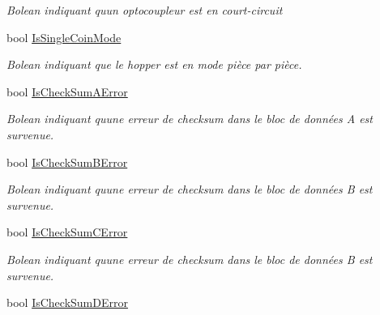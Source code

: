 \begin{DoxyCompactItemize}
\begin{DoxyCompactList}\small\item\em Bolean indiquant qu\textquotesingle{}un optocoupleur est en court-\/circuit \end{DoxyCompactList}\item 
bool \mbox{\hyperlink{class_device_library_1_1_c_hopper_ac8bdea555bab297e4533885935005ad9}{Is\+Single\+Coin\+Mode}}
\begin{DoxyCompactList}\small\item\em Bolean indiquant que le hopper est en mode pièce par pièce. \end{DoxyCompactList}\item 
bool \mbox{\hyperlink{class_device_library_1_1_c_hopper_ab6b53cde806c99f06e7ab4e51044c68c}{Is\+Check\+Sum\+A\+Error}}
\begin{DoxyCompactList}\small\item\em Bolean indiquant qu\textquotesingle{}une erreur de checksum dans le bloc de données A est survenue. \end{DoxyCompactList}\item 
bool \mbox{\hyperlink{class_device_library_1_1_c_hopper_a97fc7f01be900cd25941c1cc0d1ff053}{Is\+Check\+Sum\+B\+Error}}
\begin{DoxyCompactList}\small\item\em Bolean indiquant qu\textquotesingle{}une erreur de checksum dans le bloc de données B est survenue. \end{DoxyCompactList}\item 
bool \mbox{\hyperlink{class_device_library_1_1_c_hopper_abcd01eec19d5cefaaf8f7a8a748777c1}{Is\+Check\+Sum\+C\+Error}}
\begin{DoxyCompactList}\small\item\em Bolean indiquant qu\textquotesingle{}une erreur de checksum dans le bloc de données B est survenue. \end{DoxyCompactList}\item 
bool \mbox{\hyperlink{class_device_library_1_1_c_hopper_af21105cacff9feef51796a71f1066d6c}{Is\+Check\+Sum\+D\+Error}}

\end{DoxyCompactItemize}
